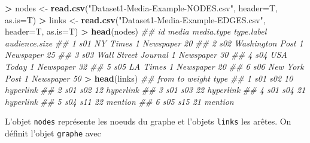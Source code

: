 \documentclass[]{article}
\newenvironment{Shaded}{\begin{snugshade}}{\end{snugshade}}
\newcommand{\CommentTok}[1]{\textcolor[rgb]{0.56,0.35,0.01}{\textit{#1}}}
\newcommand{\DataTypeTok}[1]{\textcolor[rgb]{0.13,0.29,0.53}{#1}}
\newcommand{\KeywordTok}[1]{\textcolor[rgb]{0.13,0.29,0.53}{\textbf{#1}}}
\newcommand{\NormalTok}[1]{#1}
\newcommand{\OperatorTok}[1]{\textcolor[rgb]{0.81,0.36,0.00}{\textbf{#1}}}
\newcommand{\StringTok}[1]{\textcolor[rgb]{0.31,0.60,0.02}{#1}}
\theoremstyle{definition}
\theoremstyle{definition}
\theoremstyle{definition}
\theoremstyle{remark}
\begin{document}
\begin{Shaded}
\begin{Highlighting}[]
\OperatorTok{>}\StringTok{ }\NormalTok{nodes <-}\StringTok{ }\KeywordTok{read.csv}\NormalTok{(}\StringTok{"Dataset1-Media-Example-NODES.csv"}\NormalTok{, }\DataTypeTok{header=}\NormalTok{T, }\DataTypeTok{as.is=}\NormalTok{T)}
\OperatorTok{>}\StringTok{ }\NormalTok{links <-}\StringTok{ }\KeywordTok{read.csv}\NormalTok{(}\StringTok{"Dataset1-Media-Example-EDGES.csv"}\NormalTok{, }\DataTypeTok{header=}\NormalTok{T, }\DataTypeTok{as.is=}\NormalTok{T)}
\OperatorTok{>}\StringTok{ }\KeywordTok{head}\NormalTok{(nodes)}
\CommentTok{##    id               media media.type type.label audience.size}
\CommentTok{## 1 s01            NY Times          1  Newspaper            20}
\CommentTok{## 2 s02     Washington Post          1  Newspaper            25}
\CommentTok{## 3 s03 Wall Street Journal          1  Newspaper            30}
\CommentTok{## 4 s04           USA Today          1  Newspaper            32}
\CommentTok{## 5 s05            LA Times          1  Newspaper            20}
\CommentTok{## 6 s06       New York Post          1  Newspaper            50}
\OperatorTok{>}\StringTok{ }\KeywordTok{head}\NormalTok{(links)}
\CommentTok{##   from  to weight      type}
\CommentTok{## 1  s01 s02     10 hyperlink}
\CommentTok{## 2  s01 s02     12 hyperlink}
\CommentTok{## 3  s01 s03     22 hyperlink}
\CommentTok{## 4  s01 s04     21 hyperlink}
\CommentTok{## 5  s04 s11     22   mention}
\CommentTok{## 6  s05 s15     21   mention}
\end{Highlighting}
\end{Shaded}

L'objet \texttt{nodes} représente les noeuds du graphe et l'objets \texttt{links} les arêtes. On définit l'objet \texttt{graphe} avec

\begin{Shaded}
\end{Shaded}
\end{document}
